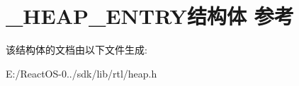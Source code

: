 \hypertarget{struct___h_e_a_p___e_n_t_r_y}{}\section{\+\_\+\+H\+E\+A\+P\+\_\+\+E\+N\+T\+R\+Y结构体 参考}
\label{struct___h_e_a_p___e_n_t_r_y}


该结构体的文档由以下文件生成\+:\begin{DoxyCompactItemize}
\item 
E\+:/\+React\+O\+S-\/0../sdk/lib/rtl/heap.\+h\end{DoxyCompactItemize}
